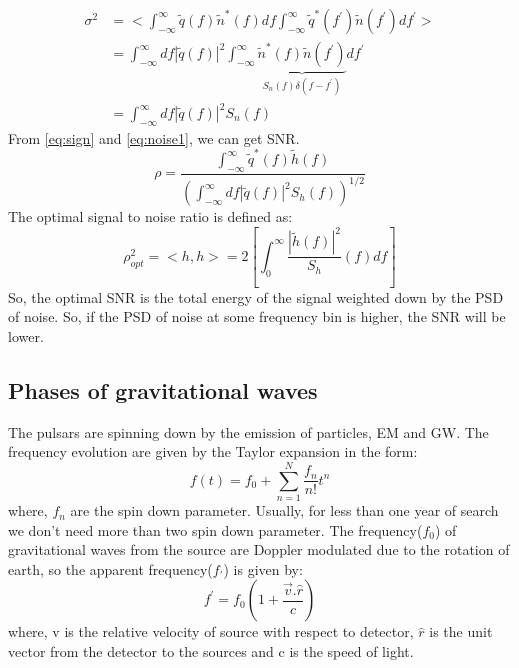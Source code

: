 \documentclass{ttuthes2007}
\begin{document}
\begin{equation}\label{eq:noise1}
\begin{split}
\sigma^{2} & =<\int_{-\infty}^{\infty}\tilde{q}(f)\tilde{n}^{*}(f)df
\int_{-\infty}^{\infty} \tilde{q}^{*}(f^{'}) \tilde{n}(f^{'})df^{'}>\\
       &= \int_{-\infty}^{\infty}df|\tilde{q}(f)|^{2}
\int_{-\infty}^{\infty}\underbrace{\tilde{n}^{*}(f)
\tilde{n}(f^{'})}_{S_{n}(f)\delta(f - f^{'})}df^{'}\\
      &=\int_{-\infty}^{\infty}df|\tilde{q}(f)|^{2} S_{n}(f)
\end{split}
\end{equation}
From \ref{eq:sign} and \ref{eq:noise1}, we can get \ac{SNR}.
\begin{equation}
\rho=\frac{\int_{-\infty}^{\infty}\tilde{q}^{*}(f)\tilde{h}(f)}{(\int_{-\infty}^{\infty}df|\tilde{q}(f)|^2
S_{h}(f))^{1/2}}
\end{equation}
The optimal signal to noise ratio is defined as:
\begin{equation}
\rho_{opt}^2 = <h,h> =2\left[\int_{0}^{\infty}\frac{|\tilde{h}(f)|^2}{S_{h}}(f){}df\right]
\end{equation}
So, the optimal \ac{SNR} is the total energy of the signal weighted down by the
\ac{PSD} of noise. So, if the \ac{PSD} of noise at some frequency bin is higher,
the \ac{SNR} will be lower.


\subsection{Phases of gravitational waves}
The pulsars are spinning down by the emission of particles, \ac{EM} and \ac{GW}.
The frequency evolution are given by the Taylor expansion in the form:
\begin{equation}
f(t) = f_0 + \sum_{n=1}^{N} \frac{f_n}{n!}t^n
\end{equation}
where, $f_n$ are the spin down parameter. Usually, for less than one year of
search we don't need more than two spin down parameter. 
The frequency($f_0$) of gravitational waves from the source are Doppler modulated due to the
rotation of earth, so the apparent frequency($f_\prime$) is given by:
\begin{equation} 
f^\prime = f_0 \left(1+\frac{\vec{v}.\hat{r}}{c}\right)
\end{equation}
where, v is the relative velocity of source with respect to detector, $\hat{r}$
is the unit vector from the detector to the sources and c is the speed of light.
\end{document}
